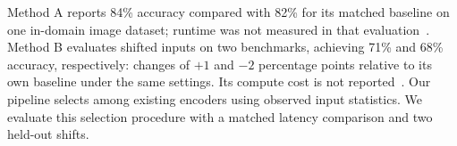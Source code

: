 Method A reports 84\% accuracy compared with 82\% for its matched baseline on one in-domain image dataset; runtime was not measured in that evaluation~\cite{sourceA}. Method B evaluates shifted inputs on two benchmarks, achieving 71\% and 68\% accuracy, respectively: changes of $+1$ and $-2$ percentage points relative to its own baseline under the same settings. Its compute cost is not reported~\cite{sourceB}. Our pipeline selects among existing encoders using observed input statistics. We evaluate this selection procedure with a matched latency comparison and two held-out shifts.
